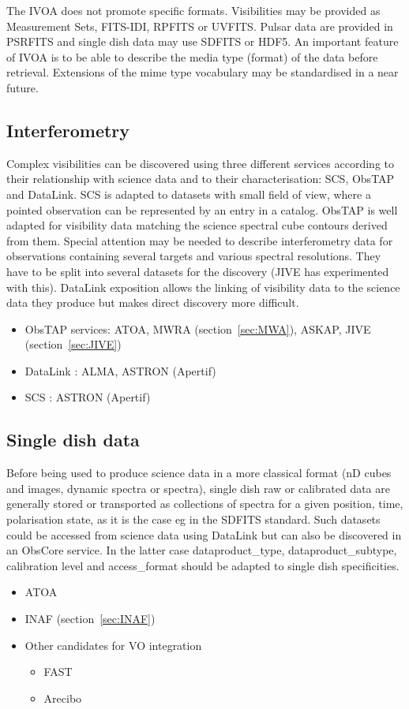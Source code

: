 \documentclass[11pt,a4paper]{ivoatex/ivoa}
\begin{document}
{The IVOA does not promote specific formats. Visibilities may be provided as Measurement Sets, FITS-IDI, 
RPFITS or UVFITS. Pulsar data are provided in PSRFITS and single dish data may use SDFITS or HDF5. An 
important feature of IVOA is to be able to describe the media type (format) of the data before 
retrieval. Extensions of the mime type vocabulary may be standardised in a near future.  

\subsection{Interferometry}
Complex visibilities can be discovered using three different services according to their relationship 
with science data and to their characterisation: SCS, ObsTAP and DataLink. SCS is adapted to datasets 
with small field of view, where a pointed observation can be
represented by an entry in a catalog. ObsTAP is well adapted for visibility data matching the science 
spectral cube contours derived from them. Special attention may be needed to describe interferometry 
data for observations containing several targets and various spectral resolutions. They have to be split 
into several datasets for the discovery (JIVE has experimented with this). DataLink exposition allows 
the linking of visibility data to the science data they produce but makes direct discovery more 
difficult. 
\begin{itemize}
\item ObsTAP services: ATOA, MWRA (section~\ref{sec:MWA}), ASKAP, JIVE (section~\ref{sec:JIVE})
\item DataLink : ALMA, ASTRON (Apertif)
\item SCS : ASTRON (Apertif)
\end{itemize}
\subsection{Single dish data}
Before being used to produce science data in a more classical format (nD cubes and images, dynamic
spectra or spectra),  single dish  raw or calibrated data are generally stored or transported as 
collections of spectra for a given position, time, polarisation state, as it is the case eg in the 
SDFITS standard. Such datasets could be accessed from science data using DataLink but can also be 
discovered in an ObsCore service. In the latter case dataproduct\_type, dataproduct\_subtype, 
calibration level and access\_format should be adapted to single dish specificities.
\begin{itemize}
\item ATOA 
\item INAF (section~\ref{sec:INAF})
\item Other candidates for VO integration
\begin{itemize}
\item  FAST
\item Arecibo
\end{itemize}
\end{itemize}
}
\end{document}
